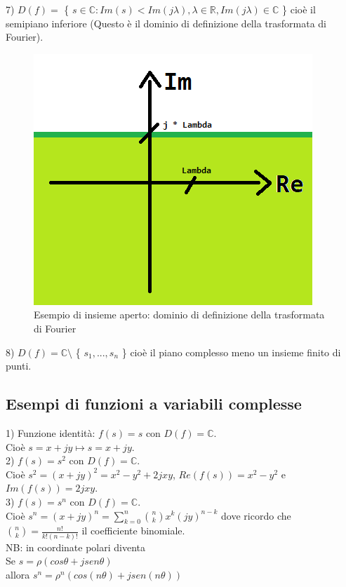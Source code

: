 \pagebreak

7) $D(f) = $ \{ $ s \in \mathbb{C} : Im(s) < Im(j\lambda ), \lambda \in \mathbb{R}, Im(j\lambda ) \in \mathbb{C} $ \} cioè il semipiano inferiore (Questo è il dominio di definizione della trasformata di Fourier).\\

\begin{figure}[h]
	\centering
	\includegraphics[scale=0.75]{immagini/dominioDefFourier}
	\caption{ Esempio di insieme aperto: dominio di definizione della trasformata di Fourier }
	\label{fig: dominioDefFourier}
\end{figure}

8) $ D(f) = \mathbb{C} \setminus$  \{ $ s_{1},...,s_{n}  $ \}  cioè il piano complesso meno un insieme finito di punti.


\subsection*{Esempi di funzioni a variabili complesse}
1) Funzione identità: $ f(s) = s$ con $ D(f) = \mathbb{C}$.\\
Cioè $ s=x+jy \mapsto s=x+jy $.\\

2) $ f(s) = s^{2}$ con $ D(f) = \mathbb{C}$.\\
Cioè $ s^{2} = (x+jy)^{2} = x^{2}-y^{2} +2jxy $, $ Re(f(s)) = x^{2}-y^{2} $ e $ Im(f(s)) = 2jxy $. \\

3) $ f(s) = s^{n}$ con $ D(f) = \mathbb{C}$.\\
Cioè $ s^{n} = (x+jy)^{n} = \sum_{k=0}^n \binom{n}{k} x^{k} (jy)^{n-k} $ dove ricordo che $ \binom{n}{k} = \frac{n!}{k! (n-k)!} $ il coefficiente binomiale. \\
NB: in coordinate polari diventa \\
Se $ s = \rho (cos\theta + j sen\theta) $ \\
allora $ s^{n} = \rho^{n} (cos(n\theta) + j sen(n\theta ) ) $ \\

